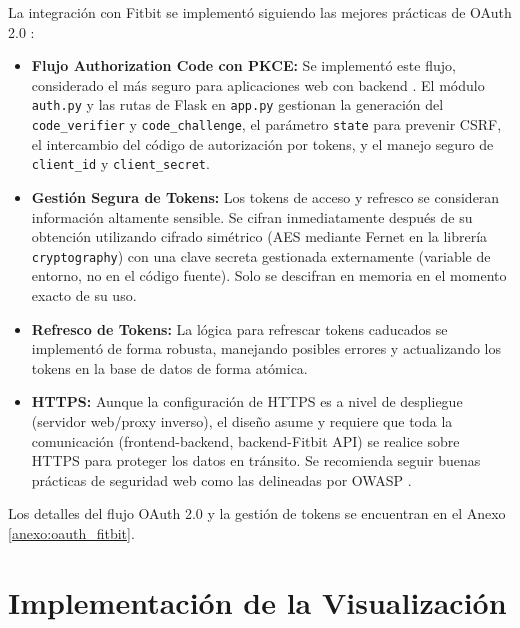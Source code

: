 La integración con Fitbit se implementó siguiendo las mejores prácticas de OAuth 2.0 \citep{oauth_spec_rfc6749}:
\begin{itemize}
    \item \textbf{Flujo Authorization Code con PKCE:} Se implementó este flujo, considerado el más seguro para aplicaciones web con backend \citep{oauth_security_bcp_rfc8252}. El módulo \texttt{auth.py} y las rutas de Flask en \texttt{app.py} gestionan la generación del \texttt{code\_verifier} y \texttt{code\_challenge}, el parámetro \texttt{state} para prevenir CSRF, el intercambio del código de autorización por tokens, y el manejo seguro de \texttt{client\_id} y \texttt{client\_secret}.
    \item \textbf{Gestión Segura de Tokens:} Los tokens de acceso y refresco se consideran información altamente sensible. Se cifran inmediatamente después de su obtención utilizando cifrado simétrico (AES mediante Fernet en la librería \texttt{cryptography}) con una clave secreta gestionada externamente (variable de entorno, no en el código fuente). Solo se descifran en memoria en el momento exacto de su uso.
    \item \textbf{Refresco de Tokens:} La lógica para refrescar tokens caducados se implementó de forma robusta, manejando posibles errores y actualizando los tokens en la base de datos de forma atómica.
    \item \textbf{HTTPS:} Aunque la configuración de HTTPS es a nivel de despliegue (servidor web/proxy inverso), el diseño asume y requiere que toda la comunicación (frontend-backend, backend-Fitbit API) se realice sobre HTTPS para proteger los datos en tránsito. Se recomienda seguir buenas prácticas de seguridad web como las delineadas por OWASP \citep{owasp_top10}.
\end{itemize}
Los detalles del flujo OAuth 2.0 y la gestión de tokens se encuentran en el Anexo \ref{anexo:oauth_fitbit}.

\section{Implementación de la Visualización}
\label{sec:impl_visualizacion}

